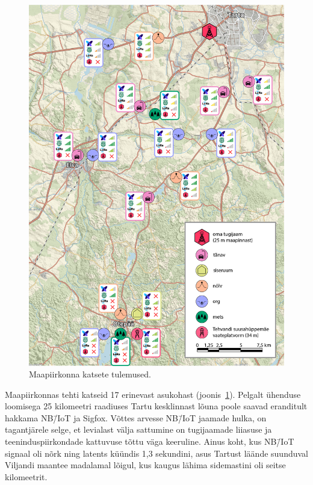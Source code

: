 \documentclass[12pt]{article}
\begin{document}
    \begin{figure} [p]
        \begin{center}
            \vspace*{-0.5cm}
            \includegraphics[width=1\textwidth]{figures/maapiirkonnakatsed2.jpg}
            \caption{Maapiirkonna katsete tulemused.}
            \label{fig:maapiirkonnakatsed}
        \end{center}
    \end{figure}

    Maapiirkonnas tehti katseid 17 erinevast asukohast (joonis~\ref{fig:maapiirkonnakatsed}). Pelgalt ühenduse loomisega 25 kilomeetri raadiuses Tartu kesklinnast lõuna poole saavad eranditult hakkama NB\=/IoT ja Sigfox.
    Võttes arvesse NB\=/IoT jaamade hulka, on tagantjärele selge, et levialast välja sattumine on tugijaamade liiasuse ja teeninduspiirkondade kattuvuse tõttu väga keeruline.
    Ainus koht, kus NB\=/IoT signaal oli nõrk ning latents küündis 1,3 sekundini, asus Tartust läände suunduval Viljandi maantee madalamal lõigul, kus kaugus lähima sidemastini oli seitse kilomeetrit.
\end{document}
